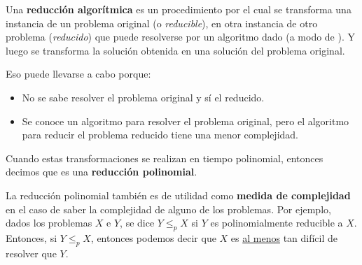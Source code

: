 \documentclass[../tp3_grupo404.tex]{subfiles}
\begin{document}
Una \textbf{reducción algorítmica} es un procedimiento por el cual se transforma una instancia
de un problema original (o \emph{reducible}), en otra instancia de otro problema (\emph{reducido})
que puede resolverse por un algoritmo dado (a modo de ).
Y luego se transforma la solución obtenida en una solución del problema original.

Eso puede llevarse a cabo porque:
\begin{itemize}
    \item No se sabe resolver el problema original y sí el reducido.
    \item Se conoce un algoritmo para resolver el problema original,
        pero el algoritmo para reducir el problema reducido tiene
        una menor complejidad.
\end{itemize}

Cuando estas transformaciones se realizan en tiempo polinomial,
entonces decimos que es una \textbf{reducción polinomial}.

La reducción polinomial también es de utilidad como \textbf{medida de complejidad} en el caso de
saber la complejidad de alguno de los problemas. Por ejemplo, dados los problemas $X$ e $Y$,
se dice $Y \leq_p X$ si $Y$ es polinomialmente reducible a $X$. Entonces, si $Y \leq_p X$,
entonces podemos decir que $X$ es \underline{al menos} tan difícil de resolver que $Y$.

\end{document}
